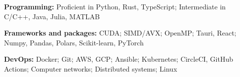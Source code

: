 \begin{enumerate}[label={[\arabic*]},nosep]
  \item \textbf{Programming:} Proficient in Python, Rust, TypeScript; Intermediate in C/C++, Java, Julia, MATLAB
  \item \textbf{Frameworks and packages:} CUDA; SIMD/AVX; OpenMP; Tauri, React; Numpy, Pandas, Polars, Scikit-learn, PyTorch
  \item \textbf{DevOps:} Docker; Git; AWS, GCP; Ansible; Kubernetes; CircleCI, GitHub Actions; Computer networks; Distributed systems; Linux
\end{enumerate}
